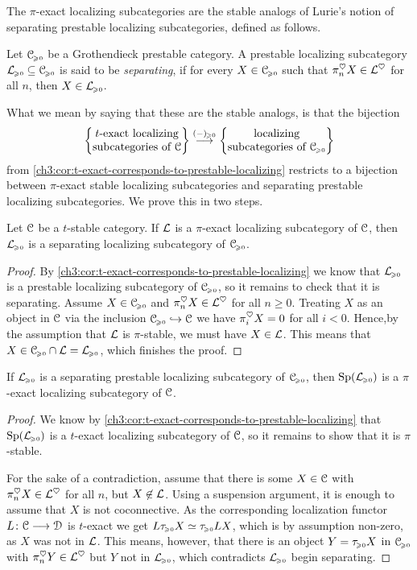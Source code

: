 The $\pi$-exact localizing subcategories are the stable analogs of Lurie's notion of separating prestable localizing subcategories, defined as follows.

\begin{definition}
    Let $\C\geqz$ be a Grothendieck prestable category. A prestable localizing subcategory $\L\geqz \subseteq \C\geqz$ is said to be \emph{separating}, if for every $X\in \C\geqz$ such that $\pi_n^\heart X\in \L^\heart$ for all $n$, then $X\in \L\geqz$. 
\end{definition}

What we mean by saying that these are the stable analogs, is that the bijection
\[\texact \overset{(-)\geqz}\to \prlocalizing\]
from \cref{ch3:cor:t-exact-corresponds-to-prestable-localizing} restricts to a bijection between $\pi$-exact stable localizing subcategories and separating prestable localizing subcategories. We prove this in two steps. 

\begin{lemma}
    \label{ch3:lm:pi-exact-then-separating}
    Let $\C$ be a $t$-stable category. If $\L$ is a $\pi$-exact localizing subcategory of $\C$, then $\L\geqz$ is a separating localizing subcategory of $\C\geqz$. 
\end{lemma}
\begin{proof}
    By \cref{ch3:cor:t-exact-corresponds-to-prestable-localizing} we know that $\L\geqz$ is a prestable localizing subcategory of $\C\geqz$, so it remains to check that it is separating. Assume $X\in \C\geqz$ and $\pi_n^\heart X \in \L^\heart$ for all $n\geq 0$. Treating $X$ as an object in $\C$ via the inclusion $\C\geqz \hookrightarrow \C$ we have $\pi_i^\heart X = 0$ for all $i<0$. Hence,by the assumption that $\L$ is $\pi$-stable, we must have $X\in \L$. This means that $X \in \C\geqz\cap \L = \L\geqz$, which finishes the proof. 
\end{proof}

\begin{lemma}
    \label{ch3:lm:separating-then-pi-exact}
    If $\L\geqz$ is a separating prestable localizing subcategory of $\C\geqz$, then $\Sp(\L\geqz)$ is a $\pi$-exact localizing subcategory of $\C$. 
\end{lemma}
\begin{proof}
    We know by \cref{ch3:cor:t-exact-corresponds-to-prestable-localizing} that $\Sp(\L\geqz)$ is a $t$-exact localizing subcategory of $\C$, so it remains to show that it is $\pi$-stable. 

    For the sake of a contradiction, assume that there is some $X\in \C$ with $\pi_n^\heart X\in \L^\heart$ for all $n$, but $X\not\in \L$. Using a suspension argument, it is enough to assume that $X$ is not coconnective. As the corresponding localization functor $L\:\C\to \D$ is $t$-exact we get $L\tau\geqz X \simeq \tau\geqz LX$, which is by assumption non-zero, as $X$ was not in $\L$. This means, however, that there is an object $Y=\tau\geqz X$ in $\C\geqz$ with $\pi_n^\heart Y \in \L^\heart$ but $Y$ not in $\L\geqz$, which contradicts $\L\geqz$ begin separating.  
\end{proof}



